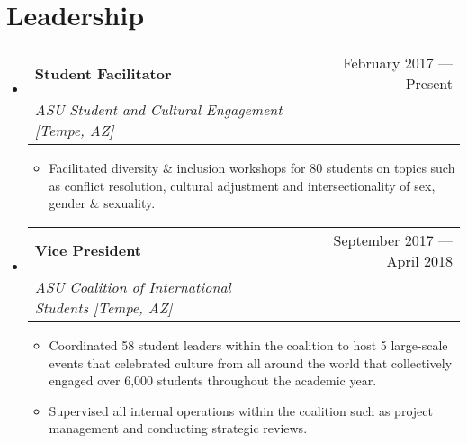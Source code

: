 \documentclass[letterpaper,11pt]{article}
\makeatletter
\newcommand{\sectionStart}{
  \begin{itemize}[label={},leftmargin=0in]
}
\newcommand{\sectionEnd}{
  \end{itemize}
}
\newcommand{\jobHeading}[3]{
  \vspace{-1pt}
  \item
  \begin{tabular*}{1.0\textwidth}{l@{\extracolsep{\fill}}r@{}}
    \normalsize{\textbf{#1}} & #2 \\
    \textit{\small#3} \\
  \end{tabular*}\vspace{-5pt}
}
\newcommand{\listStart}{\begin{itemize}}
\newcommand{\listEnd}{\end{itemize}\vspace{-5pt}}
\newcommand{\bulletItem}[1]{
  \item
  \small{
    {#1 \vspace{-1.8pt}}
  }
}
\makeatother
\begin{document}
\section{Leadership}
\sectionStart
  \jobHeading
    {Student Facilitator}
    {February 2017 --- Present}
    {ASU Student and Cultural Engagement [Tempe, AZ]}
  \listStart
    \bulletItem
    {Facilitated diversity \& inclusion workshops for 80 students on topics such as conflict resolution, cultural adjustment and intersectionality of sex, gender \& sexuality.}
  \listEnd
  \jobHeading
    {Vice President}
    {September 2017 --- April 2018}
    {ASU Coalition of International Students [Tempe, AZ]}
  \listStart
    \bulletItem
    {Coordinated 58 student leaders within the coalition to host 5 large-scale events that celebrated culture from all around the world that collectively engaged over 6,000 students throughout the academic year.}
    \bulletItem
    {Supervised all internal operations within the coalition such as project management and conducting strategic reviews.}
  \listEnd
\sectionEnd
\end{document}
